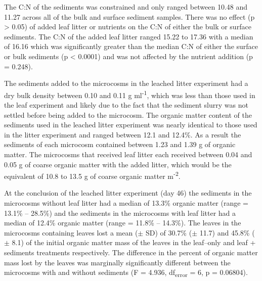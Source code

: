 The C:N of the sediments was constrained and only ranged between 10.48 and 11.27 across all of the bulk and surface sediment samples. There was no effect (p > 0.05) of added leaf litter or nutrients on the C:N of either the bulk or surface sediments. The C:N of the added leaf litter ranged 15.22 to 17.36 with a median of 16.16 which was significantly greater than the median C:N of either the surface or bulk sediments (p < 0.0001) and was not affected by the nutrient addition (p = 0.248). 

The sediments added to the microcosms in the leached litter experiment had a dry bulk density between 0.10 and 0.11 g ml\textsuperscript{-1}, which was less than those used in the leaf experiment and likely due to the fact that the sediment slurry was not settled before being added to the microcosm. The organic matter content of the sediments used in the leached litter experiment was nearly identical to those used in the litter experiment and ranged between 12.1 and 12.4\%. As a result the sediments of each microcosm contained between 1.23 and 1.39 g of organic matter. The microcosms that received leaf litter each received between 0.04 and 0.05 g of coarse organic matter with the added litter, which would be the equivalent of 10.8 to 13.5 g of coarse organic matter m\textsuperscript{-2}.

At the conclusion of the leached litter experiment (day 46) the sediments in the microcosms without leaf litter had a median of 13.3\% organic matter (range = 13.1\% -- 28.5\%) and the sediments in the microcosms with leaf litter had a median of 12.4\% organic matter (range = 11.8\% -- 14.3\%). The leaves in the microcosms containing leaves lost a mean ($\pm$ SD) of 30.7\% ($\pm$ 11.7) and 45.8\% ($\pm$ 8.1) of the initial organic matter mass of the leaves in the leaf--only and leaf + sediments treatments respectively. The difference in the percent of organic matter mass lost by the leaves was marginally significantly different between the microcosms with and without sediments (F = 4.936, df\textsubscript{error} = 6, p = 0.06804).

